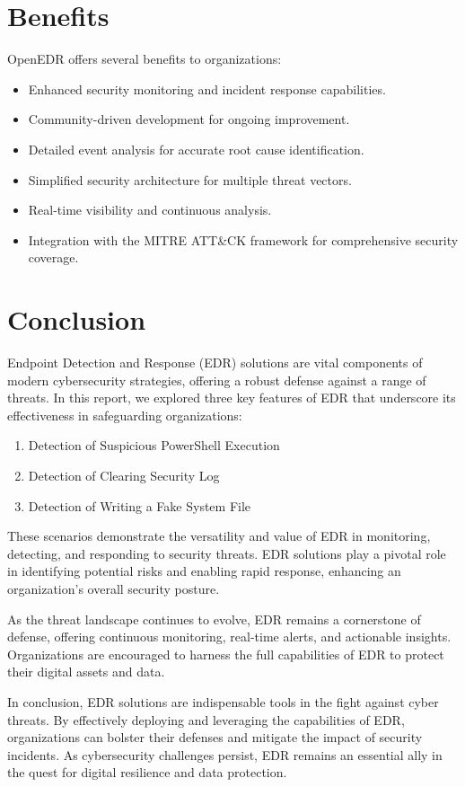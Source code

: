 \documentclass{article}
\begin{document}
\section{Benefits}
OpenEDR offers several benefits to organizations:
\begin{itemize}
    \item Enhanced security monitoring and incident response capabilities.
    \item Community-driven development for ongoing improvement.
    \item Detailed event analysis for accurate root cause identification.
    \item Simplified security architecture for multiple threat vectors.
    \item Real-time visibility and continuous analysis.
    \item Integration with the MITRE ATT\&CK framework for comprehensive security coverage.
\end{itemize}

\section{Conclusion}

Endpoint Detection and Response (EDR) solutions are vital components of modern cybersecurity strategies, offering a robust defense against a range of threats. In this report, we explored three key features of EDR that underscore its effectiveness in safeguarding organizations:

\begin{enumerate}
    \item Detection of Suspicious PowerShell Execution
    \item Detection of Clearing Security Log
    \item Detection of Writing a Fake System File
\end{enumerate}

These scenarios demonstrate the versatility and value of EDR in monitoring, detecting, and responding to security threats. EDR solutions play a pivotal role in identifying potential risks and enabling rapid response, enhancing an organization's overall security posture.

As the threat landscape continues to evolve, EDR remains a cornerstone of defense, offering continuous monitoring, real-time alerts, and actionable insights. Organizations are encouraged to harness the full capabilities of EDR to protect their digital assets and data.

In conclusion, EDR solutions are indispensable tools in the fight against cyber threats. By effectively deploying and leveraging the capabilities of EDR, organizations can bolster their defenses and mitigate the impact of security incidents. As cybersecurity challenges persist, EDR remains an essential ally in the quest for digital resilience and data protection.
\end{document}
